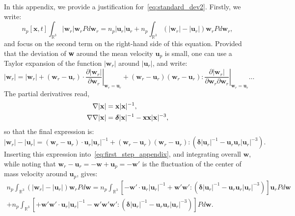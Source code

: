 In this appendix, we provide a justification for~\ref{eq:standard_dev2}.
Firstly, we write: 
\begin{equation}
    n_p[\textbf{x},t] \int_{\mathbb{R}^3} 
    |\textbf{w}_r| \textbf{w}_r
    P
    d\textbf{w}_r
    =
    n_p  
    |\textbf{u}_r|\textbf{u}_r
    + n_p  \int_{\mathbb{R}^3} 
     (|\textbf{w}_r | - |\textbf{u}_r|)\textbf{w}_r
    P
    d\textbf{w}_r,
    \label{eq:first_step_appendix}
\end{equation}
and focus on the second term on the right-hand side of this equation. 
Provided that the deviation of \textbf{w} around the mean velocity $\textbf{u}_p$ is small, one can use a Taylor expansion of the function $|\textbf{w}_r|$ around $|\textbf{u}_r|$, and write:
\begin{equation}
    |\textbf{w}_r| =   
    |\textbf{w}_r|
    + (\textbf{w}_r - \textbf{u}_r)\cdot \left. \frac{\partial  |\textbf{w}_r|}{\partial \textbf{w}_r} \right|_{\textbf{w}_r = \textbf{u}_r}
    + (\textbf{w}_r - \textbf{u}_r)(\textbf{w}_r - \textbf{u}_r) : \left. \frac{\partial  |\textbf{w}_r|}{\partial \textbf{w}_r\partial \textbf{w}_r}  \right|_{\textbf{w}_r = \textbf{u}_r} \ldots
\end{equation}
The partial derivatives read, 
\begin{align}
    \mathbf{\nabla}|\textbf{x}| &=\textbf{x} |\textbf{x}|^{-1},\\
    \mathbf{\nabla}\mathbf{\nabla}|\textbf{x}| &= \bm\delta |\textbf{x}|^{-1} - \textbf{xx} |\textbf{x}|^{-3},
\end{align}
so that the final expression is:  
\begin{equation}
    |\textbf{w}_r| 
    - |\textbf{u}_r|
    =
    (\textbf{w}_r - \textbf{u}_r)\cdot \textbf{u}_r |\textbf{u}_r|^{-1}
    +(\textbf{w}_r - \textbf{u}_r)(\textbf{w}_r - \textbf{u}_r):
    (\bm\delta |\textbf{u}_r|^{-1} - \textbf{u}_r\textbf{u}_r|\textbf{u}_r|^{-3}). 
\end{equation}
Inserting this expression into~\ref{eq:first_step_appendix}, and integrating overall $\textbf{w}$, while noting that $\textbf{w}_r - \textbf{u}_r = -\textbf{w} + \textbf{u}_p = -\textbf{w}'$ is the fluctuation of the center of mass velocity around $\textbf{u}_p$, gives: 
\begin{multline*}
    n_p \int_{\mathbb{R}^3}(|\textbf{w}_r|  - |\textbf{u}_r|) \textbf{w}_r P d\textbf{w} 
    =
    n_p \int_{\mathbb{R}^3}
    [
    -\textbf{w}' \cdot \textbf{u}_r |\textbf{u}_r|^{-1}
    +\textbf{w}' \textbf{w}' :
    (\bm\delta |\textbf{u}_r|^{-1} - \textbf{u}_r\textbf{u}_r|\textbf{u}_r|^{-3})
    ] \textbf{u}_r P d\textbf{w}\\
    +
    n_p \int_{\mathbb{R}^3}
    [
    +\textbf{w}' \textbf{w}' \cdot \textbf{u}_r |\textbf{u}_r|^{-1}
    -\textbf{w}' \textbf{w}' \textbf{w}' :
    (\bm\delta |\textbf{u}_r|^{-1} - \textbf{u}_r\textbf{u}_r|\textbf{u}_r|^{-3})
    ]  P d\textbf{w}.
\end{multline*}
